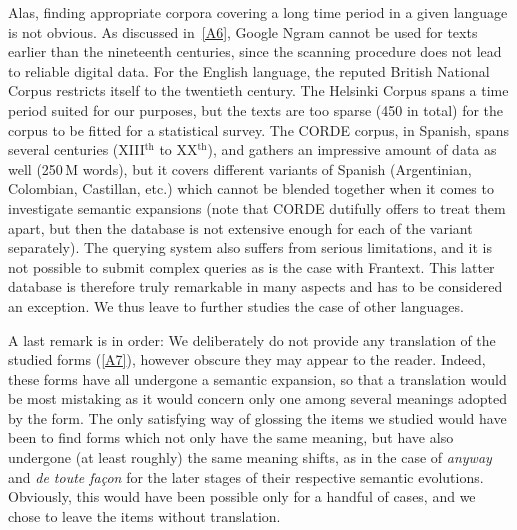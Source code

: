 \documentclass[12pt,twocolumn,amsmath,amssymb,aps,longbibliography]{revtex4-1}  %
\newcommand{\tit}{\textit}
\begin{document}
Alas, finding appropriate corpora covering a long time period in a given language is not obvious. As discussed in~\ref{A6}, Google Ngram cannot be used for texts earlier than the nineteenth centuries, since the scanning procedure does not lead to reliable digital data. For the English language, the reputed British National Corpus restricts itself to the twentieth century. The Helsinki Corpus spans a time period suited for our purposes, but the texts are too sparse (450 in total) for the corpus to be fitted for a statistical survey. The CORDE corpus, in Spanish, spans several centuries (XIII$^{\text{th}}$ to XX$^{\text{th}}$), and gathers an impressive amount of data as well (250$\,$M words), but it covers different variants of Spanish (Argentinian, Colombian, Castillan, etc.) which cannot be blended together when it comes to investigate semantic expansions (note that CORDE dutifully offers to treat them apart, but then the database is not extensive enough for each of the variant separately). The querying system also suffers from serious limitations, and it is not possible to submit complex queries as is the case with Frantext. This latter database is therefore truly remarkable in many aspects and has to be considered an exception. We thus leave to further studies the case of other languages.

A last remark is in order: We deliberately do not provide any translation of the studied forms (\ref{A7}), however obscure they may appear to the reader. Indeed, these forms have all undergone a semantic expansion, so that a translation would be most mistaking as it would concern only one among several meanings adopted by the form. The only satisfying way of glossing the items we studied would have been to find forms which not only have the same meaning, but have also undergone (at least roughly) the same meaning shifts, as in the case of \tit{anyway} and \tit{de toute fa\c{c}on} for the later stages of their respective semantic evolutions. Obviously, this would have been possible only for a handful of cases, and we chose to leave the items without translation.
\end{document}

